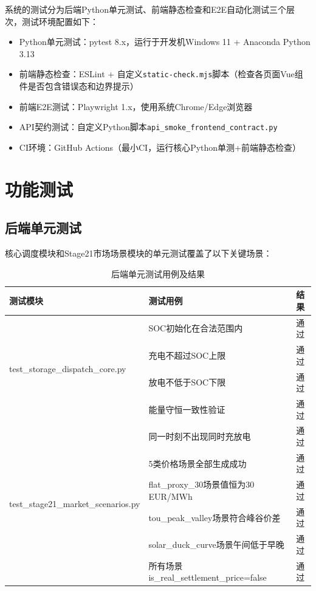 \documentclass[12pt,a4paper]{ctexbook}
\begin{document}
系统的测试分为后端Python单元测试、前端静态检查和E2E自动化测试三个层次，测试环境配置如下：

\begin{itemize}
  \item Python单元测试：pytest 8.x，运行于开发机Windows 11 + Anaconda Python 3.13
  \item 前端静态检查：ESLint + 自定义\texttt{static-check.mjs}脚本（检查各页面Vue组件是否包含错误态和边界提示）
  \item 前端E2E测试：Playwright 1.x，使用系统Chrome/Edge浏览器
  \item API契约测试：自定义Python脚本\texttt{api\_smoke\_frontend\_contract.py}
  \item CI环境：GitHub Actions（最小CI，运行核心Python单测+前端静态检查）
\end{itemize}

\section{功能测试}

\subsection{后端单元测试}

核心调度模块和Stage21市场场景模块的单元测试覆盖了以下关键场景：

\begin{table}[H]
\centering
\caption{后端单元测试用例及结果}
\label{tab:unit-tests}
\begin{tabular}{@{}llc@{}}
\toprule
\textbf{测试模块} & \textbf{测试用例} & \textbf{结果} \\
\midrule
\multirow{4}{*}{test\_storage\_dispatch\_core.py}
  & SOC初始化在合法范围内 & 通过 \\
  & 充电不超过SOC上限 & 通过 \\
  & 放电不低于SOC下限 & 通过 \\
  & 能量守恒一致性验证 & 通过 \\
  & 同一时刻不出现同时充放电 & 通过 \\
\midrule
\multirow{4}{*}{test\_stage21\_market\_scenarios.py}
  & 5类价格场景全部生成成功 & 通过 \\
  & flat\_proxy\_30场景值恒为30 EUR/MWh & 通过 \\
  & tou\_peak\_valley场景符合峰谷价差 & 通过 \\
  & solar\_duck\_curve场景午间低于早晚 & 通过 \\
  & 所有场景is\_real\_settlement\_price=false & 通过 \\
\bottomrule
\end{tabular}
\end{table}
\end{document}
